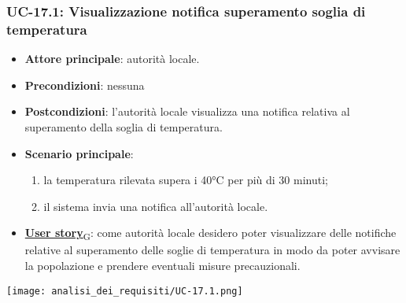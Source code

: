 \subsubsection{UC-17.1: Visualizzazione notifica superamento soglia di temperatura}
\begin{itemize}
	\item \textbf{Attore principale}: autorità locale.
	\item \textbf{Precondizioni}: nessuna
	\item \textbf{Postcondizioni}: l'autorità locale visualizza una notifica relativa al superamento della soglia di temperatura.
	\item \textbf{Scenario principale}:
	      \begin{enumerate}
		      \item la temperatura rilevata supera i 40°C per più di 30 minuti;
		      \item il sistema invia una notifica all'autorità locale.
	      \end{enumerate}
	\item \href{https://7last.github.io/docs/pb/documentazione-interna/glossario\#user-story}{\textbf{User story}\textsubscript{G}}:
	      come autorità locale desidero poter visualizzare delle notifiche relative al superamento delle soglie di temperatura
	      in modo da poter avvisare la popolazione e prendere eventuali misure precauzionali.
\end{itemize}
\begin{center}
	\texttt{[image: analisi\_dei\_requisiti/UC-17.1.png]}
\end{center}

\newpage
